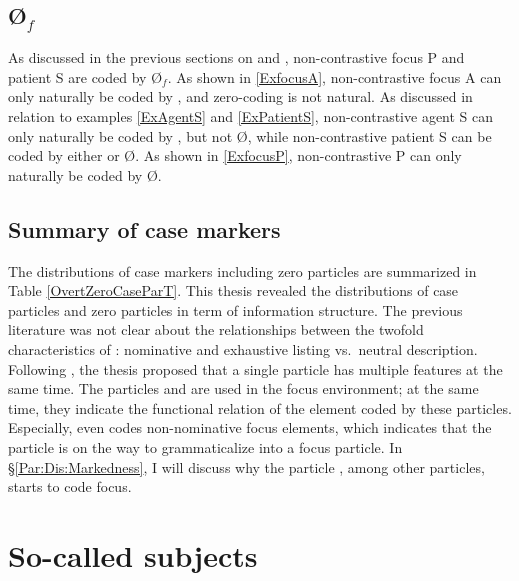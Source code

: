 
\subsection{{\O$_{f}$}}\label{FocZero}

As discussed in the previous sections on  and ,
non-contrastive focus P and patient S are coded by {\O$_{f}$}.
As shown in \ref{ExfocusA},
non-contrastive focus A can only naturally be coded by ,
and zero-coding is not natural.
As discussed in relation to examples \ref{ExAgentS} and \ref{ExPatientS},
non-contrastive agent S can only naturally be coded by , but not {\O},
while non-contrastive patient S can be coded by either  or {\O}.
As shown in \ref{ExfocusP},
non-contrastive P can only naturally be coded by {\O}.

\subsection{Summary of case markers}

The distributions of case markers including zero particles are summarized in Table \ref{OvertZeroCaseParT}.
This thesis revealed the distributions of case particles and zero particles in term of information structure.
The previous literature was not clear about the relationships between the twofold characteristics of :
nominative and exhaustive listing vs.~neutral description.
Following ,
the thesis proposed that
a single particle has multiple features at the same time.
The particles  and  are used in the focus environment;
at the same time, they indicate the functional relation of the element coded by these particles.
Especially,  even codes non-nominative focus elements,
which indicates that the particle is on the way to grammaticalize into a focus particle.
In \S \ref{Par:Dis:Markedness},
I will discuss why the particle , among other particles,
starts to code focus.

\section{So-called subjects}\label{Par:ArgStr}

